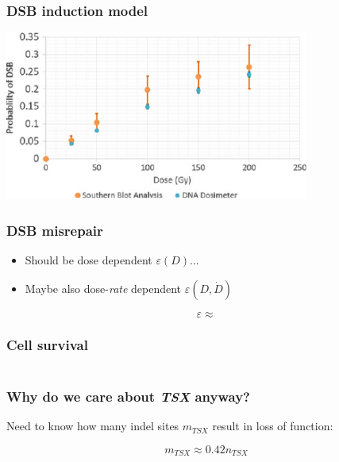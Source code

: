 \documentclass{beamer}
\begin{document}
\begin{frame}
    \frametitle{DSB induction model}
    \begin{center}
        \includegraphics[width=0.75\textwidth]{figures/MObeidat2018}
    \end{center}
\end{frame}

\begin{frame}
    \frametitle{DSB misrepair}

    \begin{itemize}
        \item Should be dose dependent $\varepsilon(D)$...
        \item Maybe also dose-\emph{rate} dependent $\varepsilon(D,\dot{D})$
    \end{itemize}
    \begin{equation*}
        \varepsilon \approx %
    \end{equation*}
\end{frame}

\begin{frame}
    \frametitle{Cell survival}
    \framesubtitle{}
    \begin{columns}
        \begin{column}{0.5\textwidth}

        \end{column}
    \end{columns}
\end{frame}

\begin{frame}
    \frametitle{Why do we care about \emph{TSX} anyway?}
    Need to know how many indel sites $m_{TSX}$ result in loss of function:

    \begin{equation}
        m_{TSX} \approx 0.42 n_{TSX}
    \end{equation}
\end{frame}
\end{document}
